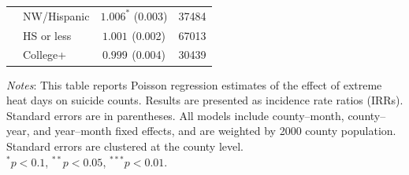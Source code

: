 \documentclass[12pt, a4paper]{article}
\begin{document}
\begin{table}[H]
\begin{tabular}{llcc}
 & NW/Hispanic & $1.006^{*}$ (0.003) & 37484 \\
 & HS or less & $1.001^{}$ (0.002) & 67013 \\
 & College+ & $0.999^{}$ (0.004) & 30439 \\
\bottomrule
\end{tabular}
\vspace{0.5em}
\begin{flushleft}
\footnotesize
\textit{Notes}: This table reports Poisson regression estimates of the effect of extreme heat days on suicide counts. Results are presented as incidence rate ratios (IRRs). Standard errors are in parentheses. All models include county--month, county--year, and year--month fixed effects, and are weighted by 2000 county population. Standard errors are clustered at the county level.\\
$^{*}p<0.1$, $^{**}p<0.05$, $^{***}p<0.01$.
\end{flushleft}
\end{table}





\newpage
{}
\singlespacing
  

\nocite{*}
\end{document}
